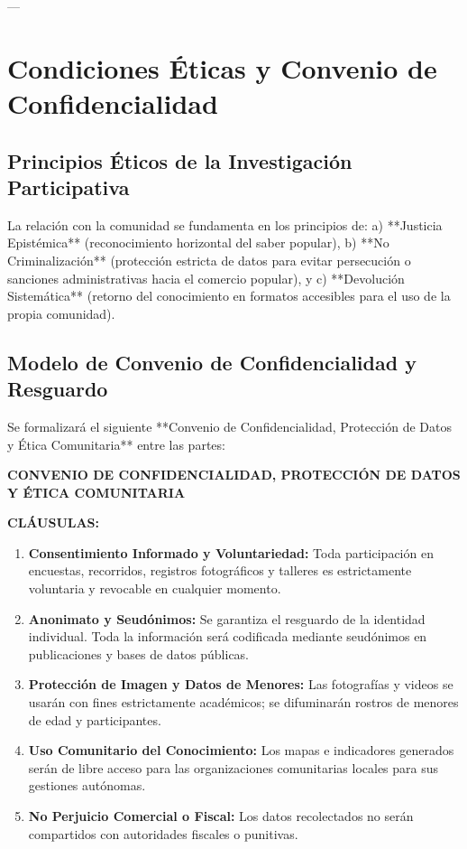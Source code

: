 \documentclass[12pt,a4paper]{article}
\begin{document}
---

\section{Condiciones Éticas y Convenio de Confidencialidad}

\subsection{Principios Éticos de la Investigación Participativa}
La relación con la comunidad se fundamenta en los principios de: a) **Justicia Epistémica** (reconocimiento horizontal del saber popular), b) **No Criminalización** (protección estricta de datos para evitar persecución o sanciones administrativas hacia el comercio popular), y c) **Devolución Sistemática** (retorno del conocimiento en formatos accesibles para el uso de la propia comunidad).

\subsection{Modelo de Convenio de Confidencialidad y Resguardo}
Se formalizará el siguiente **Convenio de Confidencialidad, Protección de Datos y Ética Comunitaria** entre las partes:

\begin{center}
\textbf{CONVENIO DE CONFIDENCIALIDAD, PROTECCIÓN DE DATOS Y ÉTICA COMUNITARIA}
\end{center}

\noindent \textbf{CLÁUSULAS:}
\begin{enumerate}[label=\textbf{\Roman*.}]
    \item \textbf{Consentimiento Informado y Voluntariedad:} Toda participación en encuestas, recorridos, registros fotográficos y talleres es estrictamente voluntaria y revocable en cualquier momento.
    \item \textbf{Anonimato y Seudónimos:} Se garantiza el resguardo de la identidad individual. Toda la información será codificada mediante seudónimos en publicaciones y bases de datos públicas.
    \item \textbf{Protección de Imagen y Datos de Menores:} Las fotografías y videos se usarán con fines estrictamente académicos; se difuminarán rostros de menores de edad y participantes.
    \item \textbf{Uso Comunitario del Conocimiento:} Los mapas e indicadores generados serán de libre acceso para las organizaciones comunitarias locales para sus gestiones autónomas.
    \item \textbf{No Perjuicio Comercial o Fiscal:} Los datos recolectados no serán compartidos con autoridades fiscales o punitivas.
\end{enumerate}
\end{document}
